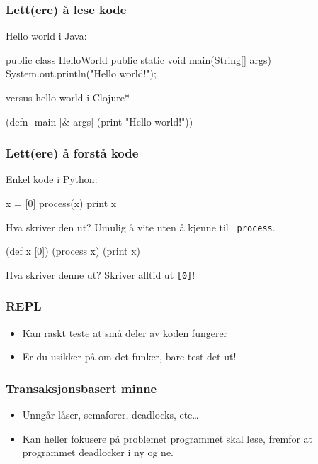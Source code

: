 \documentclass{beamer}
\begin{document}
\begin{frame}[fragile]
  \frametitle{Lett(ere) å lese kode}

  Hello world i Java:
  \vspace{3mm}
  \begin{javacode}
public class HelloWorld {
  public static void main(String[] args){
    System.out.println("Hello world!");
  }
}
  \end{javacode}

  versus hello world i Clojure*
  \vspace{3mm}
  \begin{cljcode}
(defn -main [& args]
  (print "Hello world!"))
  \end{cljcode}
\end{frame}

\begin{frame}[fragile]
  \frametitle{Lett(ere) å forstå kode}
Enkel kode i Python:
\vspace{2mm}
  \begin{pycode}
x = [0]
process(x)
print x
  \end{pycode}

\pause Hva skriver den ut? \pause Umulig å vite uten å kjenne til {\tt
  process}. \pause
\vspace{3mm}
  \begin{cljcode}
(def x [0])
(process x)
(print x)
  \end{cljcode}

Hva skriver denne ut? \pause Skriver alltid ut {\tt [0]}!
\end{frame}

\begin{frame}
  \frametitle{REPL}

  \begin{itemize}
  \item<1-> Kan raskt teste at små deler av koden fungerer
  \item<2-> Er du usikker på om det funker, bare test det ut!
  \end{itemize}
\end{frame}

\begin{frame}
  \frametitle{Transaksjonsbasert minne}

  \begin{itemize}
  \item<1-> Unngår låser, semaforer, deadlocks, etc\ldots
  \item<2-> Kan heller fokusere på problemet programmet skal løse, fremfor at
    programmet deadlocker i ny og ne.
  \end{itemize}
\end{frame}
\end{document}
